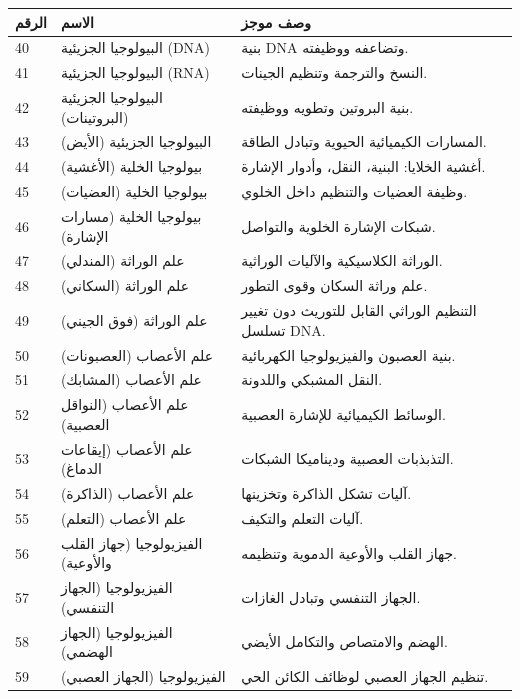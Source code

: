 \documentclass[13pt,a4paper]{article}
\begin{document}
	\begin{longtable}{|p{0.9cm}|p{6.0cm}|p{8.6cm}|}
		\hline
		\textbf{الرقم} & \textbf{الاسم} & \textbf{وصف موجز} \\
		\hline
		\endhead
		40 & البيولوجيا الجزيئية (DNA) & بنية DNA وتضاعفه ووظيفته. \\
		\hline
		41 & البيولوجيا الجزيئية (RNA) & النسخ والترجمة وتنظيم الجينات. \\
		\hline
		42 & البيولوجيا الجزيئية (البروتينات) & بنية البروتين وتطويه ووظيفته. \\
		\hline
		43 & البيولوجيا الجزيئية (الأيض) & المسارات الكيميائية الحيوية وتبادل الطاقة. \\
		\hline
		44 & بيولوجيا الخلية (الأغشية) & أغشية الخلايا: البنية، النقل، وأدوار الإشارة. \\
		\hline
		45 & بيولوجيا الخلية (العضيات) & وظيفة العضيات والتنظيم داخل الخلوي. \\
		\hline
		46 & بيولوجيا الخلية (مسارات الإشارة) & شبكات الإشارة الخلوية والتواصل. \\
		\hline
		47 & علم الوراثة (المندلي) & الوراثة الكلاسيكية والآليات الوراثية. \\
		\hline
		48 & علم الوراثة (السكاني) & علم وراثة السكان وقوى التطور. \\
		\hline
		49 & علم الوراثة (فوق الجيني) & التنظيم الوراثي القابل للتوريث دون تغيير تسلسل DNA. \\
		\hline
		50 & علم الأعصاب (العصبونات) & بنية العصبون والفيزيولوجيا الكهربائية. \\
		\hline
		51 & علم الأعصاب (المشابك) & النقل المشبكي واللدونة. \\
		\hline
		52 & علم الأعصاب (النواقل العصبية) & الوسائط الكيميائية للإشارة العصبية. \\
		\hline
		53 & علم الأعصاب (إيقاعات الدماغ) & التذبذبات العصبية وديناميكا الشبكات. \\
		\hline
		54 & علم الأعصاب (الذاكرة) & آليات تشكل الذاكرة وتخزينها. \\
		\hline
		55 & علم الأعصاب (التعلم) & آليات التعلم والتكيف. \\
		\hline
		56 & الفيزيولوجيا (جهاز القلب والأوعية) & جهاز القلب والأوعية الدموية وتنظيمه. \\
		\hline
		57 & الفيزيولوجيا (الجهاز التنفسي) & الجهاز التنفسي وتبادل الغازات. \\
		\hline
		58 & الفيزيولوجيا (الجهاز الهضمي) & الهضم والامتصاص والتكامل الأيضي. \\
		\hline
		59 & الفيزيولوجيا (الجهاز العصبي) & تنظيم الجهاز العصبي لوظائف الكائن الحي. \\

\end{longtable}
\end{document}
